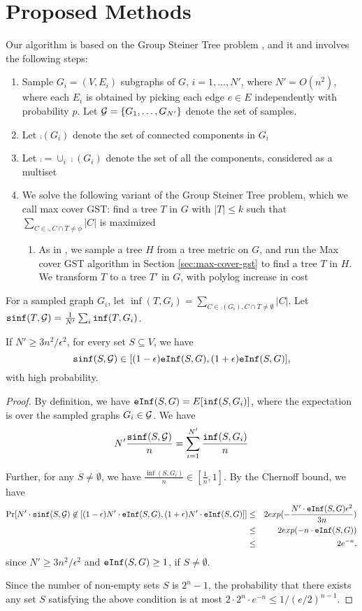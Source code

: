 \section{Proposed Methods}
Our algorithm is based on the Group Steiner Tree problem \cite{reich1989beyond, garg:ja00}, and it and involves the following steps:
\begin{enumerate}
\item
Sample $G_i=(V, E_i)$ subgraphs of $G$, $i=1,\ldots,N'$, where $N'=O(n^2)$, where each $E_i$ is obtained
by picking each edge $e\in E$ independently with probability $p$. Let $\mathcal{G}=\{G_1,\ldots,G_{N'}\}$ denote the set of samples.
\item
Let $\comp(G_i)$ denote the set of connected components in $G_i$
\item
Let $\comp=\cup_i \comp(G_i)$ denote the set of all the components, considered as a multiset
\item
We solve the following variant of the Group Steiner Tree problem, which we call max cover GST: find a tree $T$ in $G$ with
$|T|\leq k$ such that $\sum_{C\in\comp, C\cap T\neq\phi} |C|$ is maximized
\begin{enumerate}
\item
As in \cite{garg:ja00}, we sample a tree $H$ from a tree metric on $G$, and run the Max cover GST algorithm
in Section \ref{sec:max-cover-gst} to find a tree $T$ in $H$. We transform $T$ to a tree $T'$ in $G$,
with polylog increase in cost
\end{enumerate}
\end{enumerate}

For a sampled graph $G_i$, let $\inf(T, G_i)=\sum_{C\in \comp(G_i), C\cap T\neq\emptyset} |C|$. Let $\texttt{sinf}(T, \mathcal{G})=\frac{1}{N'}\sum_i \texttt{inf}(T, G_i)$.

\begin{lemma}
\label{lemma:conc}
If $N'\geq 3n^2/\epsilon^2$, for every set $S\subseteq V$, we have 
\[
\texttt{sinf}(S, \mathcal{G})\in[(1-\epsilon)\texttt{eInf}(S,G), (1+\epsilon)\texttt{eInf}(S, G)],
\]
with high probability.
\end{lemma}
\begin{proof}
By definition, we have $\texttt{eInf}(S, G)=E[\texttt{inf}(S, G_i)]$, where the expectation is over the sampled graphs $G_i\in\mathcal{G}$. We have
\[
N'\frac{\texttt{sinf}(S,\mathcal{G})}{n} = \sum_{i=1}^{N'} \frac{\texttt{inf}(S, G_i)}{n}
\]

Further, for any $S\neq\emptyset$, we have $\frac{\inf(S, G_i)}{n}\in [\frac{1}{n}, 1]$. By the Chernoff bound, we have
\begin{eqnarray*}
\Pr[N'\cdot\texttt{sinf}(S,\mathcal{G})\not\in[(1-\epsilon)N'\cdot\texttt{eInf}(S, G), (1+\epsilon)N'\cdot\texttt{eInf}(S, G)]] &\leq& 2 exp(-\frac{N'\cdot\texttt{eInf}(S, G)\epsilon^2}{3n})\\
&\leq& 2 exp(-n\cdot\texttt{eInf}(S, G))\\
&\leq& 2 e^{-n},
\end{eqnarray*}
since $N'\geq 3n^2/\epsilon^2$ and $\texttt{eInf}(S, G)\geq 1$, if $S\neq\emptyset$.

Since the number of non-empty sets $S$ is $2^n-1$, the probability that there exists any set $S$ satisfying the above condition is at most $2\cdot 2^n \cdot e^{-n}\leq 1/(e/2)^{n-1}$.
\end{proof}

